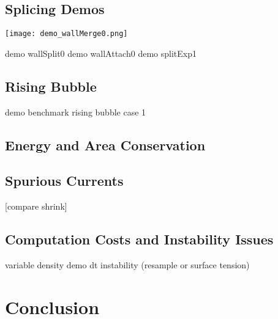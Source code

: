 \documentclass{jfm}
\begin{document}
\subsection {Splicing Demos}
    {\centering
        \texttt{[image: demo\_wallMerge0.png]}
        \par
    }
    demo wallSplit0
    demo wallAttach0
    demo splitExp1
\subsection {Rising Bubble}
    demo benchmark rising bubble case 1
\subsection {Energy and Area Conservation}
\subsection {Spurious Currents}
    [compare shrink]
\subsection {Computation Costs and Instability Issues}
    variable density
    demo dt instability (resample or surface tension)

\section {Conclusion}
\end{document}
